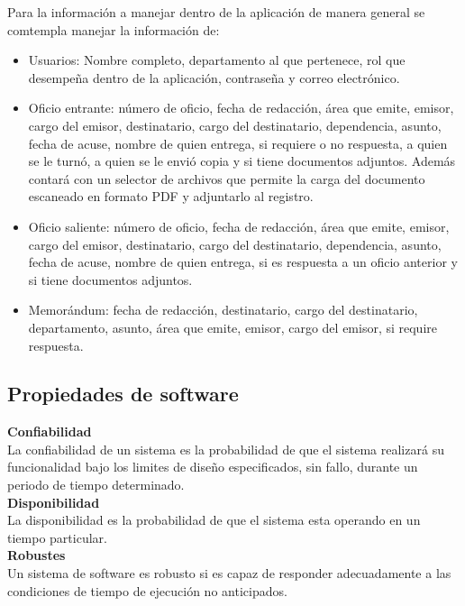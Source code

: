 Para la información a manejar dentro de la aplicación de manera general se comtempla manejar la información de:
\begin{itemize}
	\item Usuarios: Nombre completo, departamento al que pertenece, rol que desempeña dentro de la aplicación, contraseña y correo electrónico.
	\item Oficio entrante: número de oficio, fecha de redacción, área que emite, emisor, cargo del emisor, destinatario, cargo del destinatario, dependencia, asunto, fecha de acuse, nombre de quien entrega, si requiere o no respuesta, a quien se le turnó, a quien se le envió copia y si tiene documentos adjuntos. Además contará con un selector de archivos que permite la carga del documento escaneado en formato PDF y adjuntarlo al registro.
	\item Oficio saliente: número de oficio, fecha de redacción, área que emite, emisor, cargo del emisor, destinatario, cargo del destinatario, dependencia, asunto, fecha de acuse, nombre de quien entrega, si es respuesta a un oficio anterior y si tiene documentos adjuntos.
	\item Memorándum: fecha de redacción, destinatario, cargo del destinatario, departamento, asunto, área que emite, emisor, cargo del emisor, si require respuesta. 
\end{itemize}

\subsection{Propiedades de software}

\textbf{Confiabilidad\\}
La confiabilidad de un sistema es la probabilidad de que el sistema realizará su funcionalidad bajo los limites de diseño especificados, sin fallo, durante un periodo de tiempo determinado. \\

\textbf{Disponibilidad\\}
La disponibilidad es la probabilidad de que el sistema esta operando en un tiempo particular.\\ 

\textbf{Robustes\\}
Un sistema de software es robusto si es capaz de responder adecuadamente a las condiciones de tiempo de ejecución no anticipados.\\


